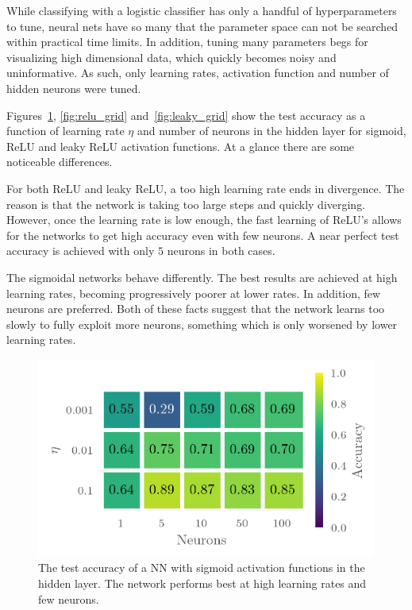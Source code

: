 While classifying with a logistic classifier has only a handful of
hyperparameters to tune, neural nets have so many that the parameter space can
not be searched within practical time limits. In addition, tuning many
parameters begs for visualizing high dimensional data, which quickly becomes
noisy and uninformative. As such, only learning rates, activation function and
number of hidden neurons were tuned.

Figures~\ref{fig:sigmoid_grid}, \ref{fig:relu_grid} and~\ref{fig:leaky_grid}
show the test accuracy as a function of learning rate \(\eta\) and number of
neurons in the hidden layer for sigmoid, ReLU and leaky ReLU activation
functions. At a glance there are some noticeable differences.

For both ReLU and leaky ReLU, a too high learning rate ends in divergence. The
reason is that the network is taking too large steps and
quickly diverging. However, once the learning rate is low enough, the fast
learning of ReLU's allows for the networks to get high accuracy even with few
neurons. A near perfect test accuracy is achieved with only \(5\) neurons in
both cases. 

The sigmoidal networks behave differently. The best results are achieved at high
learning rates, becoming progressively poorer at lower rates. In addition,
few neurons are preferred. Both of these facts suggest that the network learns
too slowly to fully exploit more neurons, something which is only worsened by
lower learning rates.

\begin{figure}[H]
  \centering
  \includegraphics[]{figures/sigmoidgrid.png}
  \caption{\label{fig:sigmoid_grid} The test accuracy of a NN with sigmoid
    activation functions in the hidden layer. The network performs best at high learning
    rates and few neurons. }
\end{figure}

